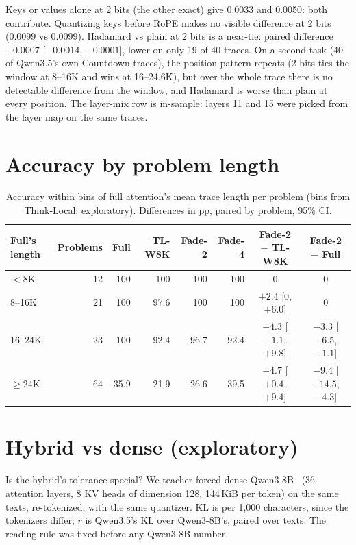 \documentclass{article}
\begin{document}
Keys or values alone at 2 bits (the other exact) give 0.0033 and 0.0050: both contribute. Quantizing keys before RoPE makes no visible difference at 2 bits (0.0099 vs 0.0099). Hadamard vs plain at 2 bits is a near-tie: paired difference $-0.0007$ [$-0.0014$, $-0.0001$], lower on only 19 of 40 traces. On a second task (40 of Qwen3.5's own Countdown traces), the position pattern repeats (2 bits ties the window at 8--16K and wins at 16--24.6K), but over the whole trace there is no detectable difference from the window, and Hadamard is worse than plain at every position. The layer-mix row is in-sample: layers 11 and 15 were picked from the layer map on the same traces.

\section{Accuracy by problem length}
\label{app:length}
\begin{table}[H]
\caption{Accuracy within bins of full attention's mean trace length per problem (bins from Think-Local; exploratory). Differences in pp, paired by problem, 95\% CI.}
\centering
\small
\setlength{\tabcolsep}{3.5pt}
\begin{tabular}{@{}lrrrrrcc@{}}
\toprule
Full's length & Problems & Full & TL-W8K & Fade-2 & Fade-4 & Fade-2 $-$ TL-W8K & Fade-2 $-$ Full \\
\midrule
$<$8K & 12 & 100 & 100 & 100 & 100 & 0 & 0 \\
8--16K & 21 & 100 & 97.6 & 100 & 100 & $+2.4$ [0, $+6.0$] & 0 \\
16--24K & 23 & 100 & 92.4 & 96.7 & 92.4 & $+4.3$ [$-1.1$, $+9.8$] & $-3.3$ [$-6.5$, $-1.1$] \\
$\ge$24K & 64 & 35.9 & 21.9 & 26.6 & 39.5 & $+4.7$ [$+0.4$, $+9.4$] & $-9.4$ [$-14.5$, $-4.3$] \\
\bottomrule
\end{tabular}
\end{table}

\section{Hybrid vs dense (exploratory)}
\label{app:dense}
Is the hybrid's tolerance special? We teacher-forced dense Qwen3-8B~\cite{qwen3} (36 attention layers, 8 KV heads of dimension 128, 144\,KiB per token) on the same texts, re-tokenized, with the same quantizer. KL is per 1,000 characters, since the tokenizers differ; $r$ is Qwen3.5's KL over Qwen3-8B's, paired over texts. The reading rule was fixed before any Qwen3-8B number.
\end{document}
